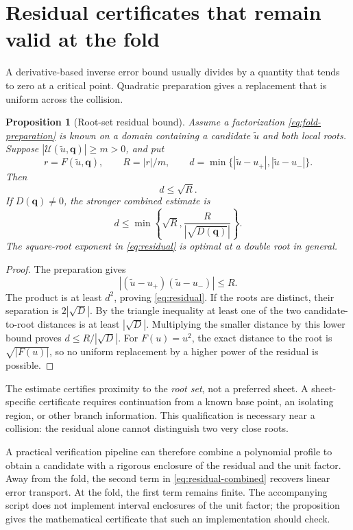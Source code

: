 \documentclass[11pt,a4paper]{article}
\newtheorem{proposition}[theorem]{Proposition}
\theoremstyle{definition}
\theoremstyle{remark}
\begin{document}
\section{Residual certificates that remain valid at the fold}
\label{sec:residual}

A derivative-based inverse error bound usually divides by a quantity
that tends to zero at a critical point. Quadratic preparation gives a
replacement that is uniform across the collision.

\begin{proposition}[Root-set residual bound]\label{prop:residual}
Assume a factorization \eqref{eq:fold-preparation} is known on a domain
containing a candidate $\widetilde u$ and both local roots. Suppose
$|\mathcal U(\widetilde u,\bm q)|\ge m>0$, and put
\[
 r=F(\widetilde u,\bm q),\qquad R=|r|/m,
 \qquad d=\min\{|\widetilde u-u_+|,|\widetilde u-u_-|\}.
\]
Then
\begin{equation}\label{eq:residual}
 d\le\sqrt R.
\end{equation}
If $D(\bm q)\ne0$, the stronger combined estimate is
\begin{equation}\label{eq:residual-combined}
 d\le\min\left\{\sqrt R,\frac{R}{|\sqrt{D(\bm q)}|}\right\}.
\end{equation}
The square-root exponent in \eqref{eq:residual} is optimal at a double
root in general.
\end{proposition}
\begin{proof}
The preparation gives
\[
 |(\widetilde u-u_+)(\widetilde u-u_-)|\le R.
\]
The product is at least $d^2$, proving \eqref{eq:residual}. If the roots
are distinct, their separation is $2|\sqrt D|$. By the triangle
inequality at least one of the two candidate-to-root distances is at
least $|\sqrt D|$. Multiplying the smaller distance by this lower bound
proves $d\le R/|\sqrt D|$.
For $F(u)=u^2$, the exact distance to the root is $\sqrt{|F(u)|}$, so no
uniform replacement by a higher power of the residual is possible.
\end{proof}

The estimate certifies proximity to the \emph{root set}, not a preferred
sheet. A sheet-specific certificate requires continuation from a known
base point, an isolating region, or other branch information. This
qualification is necessary near a collision: the residual alone cannot
distinguish two very close roots.

A practical verification pipeline can therefore combine a polynomial
profile to obtain a candidate with a rigorous enclosure of the residual
and the unit factor. Away from the fold, the second term in
\eqref{eq:residual-combined} recovers linear error transport. At the fold,
the first term remains finite. The accompanying script does not implement
interval enclosures of the unit factor; the proposition gives the
mathematical certificate that such an implementation should check.
\end{document}
